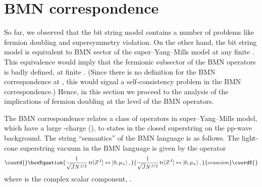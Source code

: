 \documentclass[a4paper]{article}
\providecommand{\ii}{\mathrm{i}}
\providecommand{\ket}[1]{\left|#1\right\rangle}
\providecommand{\tr}{\mathop{\mathrm{tr}}\nolimits}
\begin{document}
\section{BMN correspondence}

So far, we observed that the bit string model contains a number of
problems like fermion doubling and supersymmetry violation. On the
other hand, the bit string model is equivalent to BMN sector of
the super--Yang--Mills model at any finite \coordHE{}. This equivalence
would imply that the fermionic subsector of the BMN operators is badly
defined, at finite \coordHE{}. (Since there is no definition for the BMN
correspondence at \coordHE{}, this would signal a self-consistency
problem in the BMN correspondence.) Hence, in this section we
proceed to the analysis of the implications of fermion doubling at
the level of the BMN operators.

The BMN correspondence \cite{Berenstein:2002jq} relates a class of
operators in \coordHE{} super--Yang--Mills model, which have a
large \coordHE{}-charge (\coordHE{}), to states in the closed
superstring on the pp-wave background.
The string ``semantics'' of the BMN language is as follows. The
light-cone superstring vacuum in the BMN language is given by the
operator
\begin{equation}\coord{}\boxEquation{\label{BMN-ground}
  \frac{1}{\sqrt{J}N^{J/2}}\tr[Z^J] \leftrightarrow \ket{0,p_{+}},
}{\frac{1}{\sqrt{J}N^{J/2}}\tr[Z^J] \leftrightarrow \ket{0,p_{+}},
}{ecuacion}\coordE{}\end{equation}
where \coordHE{} is the complex scalar component,
\myHighlight{$Z=(\phi^5+\ii\phi^6)/\sqrt{2}$}\coordHE{}.
\end{document}
